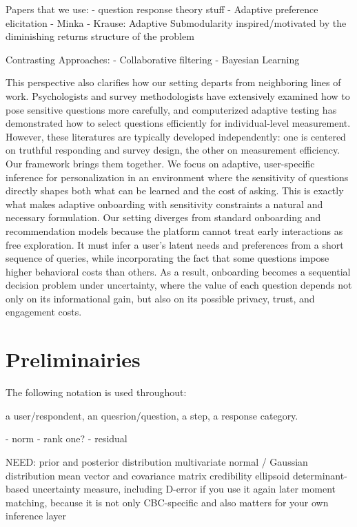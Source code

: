 \documentclass{article}
\begin{document}
Papers that we use:
- question response theory stuff
- Adaptive preference elicitation
- Minka
- Krause: Adaptive Submodularity inspired/motivated by the diminishing returns structure of the problem

Contrasting Approaches:
- Collaborative filtering
- Bayesian Learning


This perspective also clarifies how our setting departs from neighboring lines of work. Psychologists and survey methodologists have extensively examined how to pose sensitive questions more carefully, and computerized adaptive testing has demonstrated how to select questions efficiently for individual-level measurement. However, these literatures are typically developed independently: one is centered on truthful responding and survey design, the other on measurement efficiency. Our framework brings them together. We focus on adaptive, user-specific inference for personalization in an environment where the sensitivity of questions directly shapes both what can be learned and the cost of asking. This is exactly what makes adaptive onboarding with sensitivity constraints a natural and necessary formulation. Our setting diverges from standard onboarding and recommendation models because the platform cannot treat early interactions as free exploration. It must infer a user’s latent needs and preferences from a short sequence of queries, while incorporating the fact that some questions impose higher behavioral costs than others. As a result, onboarding becomes a sequential decision problem under uncertainty, where the value of each question depends not only on its informational gain, but also on its possible privacy, trust, and engagement costs.


\newpage
\chapter{Preliminairies}
The following notation is used throughout:

\begin{enumerate}
    \question[$u$] a user/respondent,
    \question[$i$] an quesrion/question,
    \question[$k$] a step,
    \question[$r$] a response category.
\end{enumerate}
- norm 
- rank one?
- residual


NEED:
prior and posterior distribution
multivariate normal / Gaussian distribution
mean vector and covariance matrix
credibility ellipsoid
determinant-based uncertainty measure, including D-error if you use it again later
moment matching, because it is not only CBC-specific and also matters for your own inference layer
\end{document}
